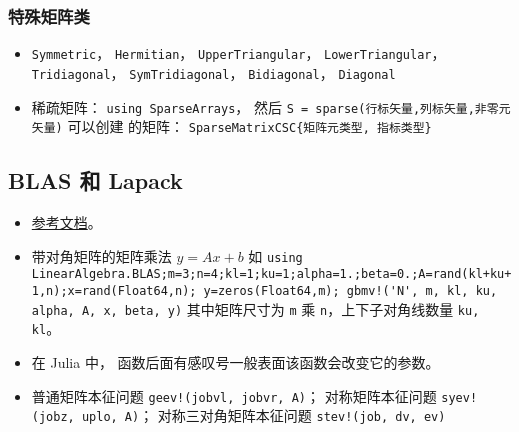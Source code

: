 \subsubsection{特殊矩阵类}
\begin{itemize}
\item \verb`Symmetric`， \verb`Hermitian`， \verb`UpperTriangular`， \verb`LowerTriangular`， \verb`Tridiagonal`， \verb`SymTridiagonal`， \verb`Bidiagonal`， \verb`Diagonal`
\item 稀疏矩阵： \verb`using SparseArrays`， 然后 \verb`S = sparse(行标矢量,列标矢量,非零元矢量)` 可以创建 的矩阵： \verb`SparseMatrixCSC{矩阵元类型, 指标类型}`
\end{itemize}

\subsection{BLAS 和 Lapack}
\begin{itemize}
\item \href{https://docs.julialang.org/en/v1/stdlib/LinearAlgebra/}{参考文档}。
\item 带对角矩阵的矩阵乘法 $y = Ax+b$ 如 \verb`using LinearAlgebra.BLAS;m=3;n=4;kl=1;ku=1;alpha=1.;beta=0.;A=rand(kl+ku+1,n);x=rand(Float64,n); y=zeros(Float64,m); gbmv!('N', m, kl, ku, alpha, A, x, beta, y)` 其中矩阵尺寸为 \verb`m` 乘 \verb`n`，上下子对角线数量 \verb`ku, kl`。
\item 在 Julia 中， 函数后面有感叹号一般表面该函数会改变它的参数。
\item 普通矩阵本征问题 \verb`geev!(jobvl, jobvr, A)`； 对称矩阵本征问题 \verb`syev!(jobz, uplo, A)`； 对称三对角矩阵本征问题 \verb`stev!(job, dv, ev)`
\end{itemize}

